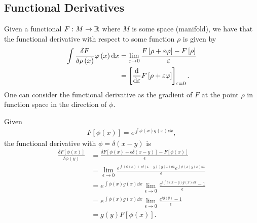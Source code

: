 \subsection{Functional Derivatives}
\begin{definition}
    Given a functional $F : M \to \mathbb{R}$ where $M$ is some space (manifold), we have that the functional derivative with respect to  some function $\rho$ is given by
     \begin{align*}
        \int \frac{\delta F}{\delta \rho\left( x \right) } \phi \left( x \right) \dd{x} &= \lim_{\epsilon \to 0} \frac{F\left[ \rho + \epsilon \phi \right] - F \left[ \rho \right] }{\epsilon} \\
                                                                                        &= \left[ \dv{\epsilon} F\left[ \rho + \epsilon \phi \right]  \right]_{\epsilon = 0}
    .\end{align*}
    One can consider the functional derivative as the gradient of $F$ at the point $\rho$ in function space in the direction of $\phi$.
\end{definition}

\begin{examples}
    Given
    \begin{align*}
        F\left[ \phi \left( x \right)  \right] = e^{\int \phi \left( x \right) g \left( x \right) \dd{x}}
    ,\end{align*}
    the functional derivative with $\phi = \delta \left( x -y \right) $ is
    \begin{align*}
        \frac{\delta F \left[ \phi \left( x \right)  \right] }{\delta\phi \left( y \right) } &= \frac{\delta F \left[ \phi \left( x \right) + \epsilon \delta \left( x -y \right)  \right] - F\left[ \phi \left( x \right)  \right] }{\epsilon} \\
        &= \lim_{\epsilon \to 0} \frac{e^{\int \left( \phi \left( x \right)  + \epsilon \delta \left( x -y \right)  \right) g \left( x \right) \dd{x}} e^{\int \phi \left( x \right)  g\left( x \right) \dd{x}}}{\epsilon}  \\
        &= e^{\int \phi \left( x \right) g\left( x \right) \dd{x} } \lim_{\epsilon \to 0} \frac{e^{\epsilon \int \delta \left( x -y \right) g\left( x \right) \dd{x}} - 1}{\epsilon} \\
        &= e^{\int \phi \left( x \right) g\left( x \right) \dd{x} } \lim_{\epsilon \to 0} \frac{e^{\epsilon g\left( y \right) } - 1}{\epsilon} \\
        &= g\left( y \right) F\left[ \phi \left( x \right)  \right] 
    .\end{align*}

\end{examples}

